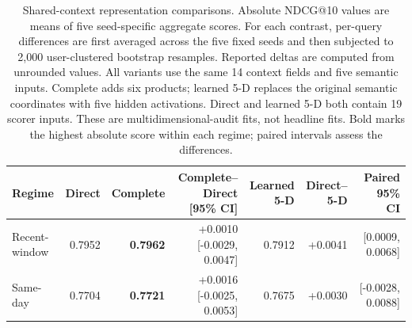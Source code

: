 \begin{table}[t]
\renewcommand{\arraystretch}{1.10}
\caption{Shared-context representation comparisons. Absolute NDCG@10 values are means of five seed-specific aggregate scores. For each contrast, per-query differences are first averaged across the five fixed seeds and then subjected to 2,000 user-clustered bootstrap resamples. Reported deltas are computed from unrounded values. All variants use the same 14 context fields and five semantic inputs. Complete adds six products; learned 5-D replaces the original semantic coordinates with five hidden activations. Direct and learned 5-D both contain 19 scorer inputs. These are multidimensional-audit fits, not headline fits. Bold marks the highest absolute score within each regime; paired intervals assess the differences.}
\label{tab:direct_complete}
\centering\small
\setlength{\tabcolsep}{3.5pt}
\begin{tabular*}{\linewidth}{@{\extracolsep{\fill}}lrrrrrr@{}}
\toprule
Regime & Direct & Complete & Complete--Direct [95\% CI] & Learned 5-D & Direct--5-D & Paired 95\% CI \\
\midrule
Recent-window & 0.7952 & \textbf{0.7962} & +0.0010 [-0.0029, 0.0047] & 0.7912 & +0.0041 & [0.0009, 0.0068] \\
Same-day & 0.7704 & \textbf{0.7721} & +0.0016 [-0.0025, 0.0053] & 0.7675 & +0.0030 & [-0.0028, 0.0088] \\
\bottomrule
\end{tabular*}
\end{table}
